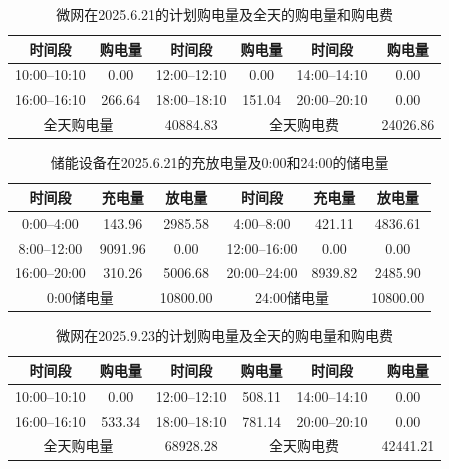 \documentclass[UTF8]{ctexart}
\begin{document}
    \begin{table}[htbp]
        \centering
        \caption{微网在2025.6.21的计划购电量及全天的购电量和购电费}
        \label{tab:q2_tenminute_0621}
        \begin{tabular}{cccccc}
            \toprule
            时间段 & 购电量 & 时间段 & 购电量 & 时间段 & 购电量 \\
            \midrule
            10:00--10:10 & 0.00 &
            12:00--12:10 & 0.00 &
            14:00--14:10 & 0.00 \\
            16:00--16:10 & 266.64 &
            18:00--18:10 & 151.04 &
            20:00--20:10 & 0.00 \\
            \midrule
            \multicolumn{2}{c}{全天购电量} &
            40884.83 &
            \multicolumn{2}{c}{全天购电费} &
            24026.86 \\
            \bottomrule
        \end{tabular}
    \end{table}
    
    \begin{table}[htbp]
        \centering
        \caption{储能设备在2025.6.21的充放电量及0:00和24:00的储电量}
        \label{tab:q2_battery_0621}
        \begin{tabular}{cccccc}
            \toprule
            时间段 & 充电量 & 放电量 & 时间段 & 充电量 & 放电量 \\
            \midrule
            0:00--4:00   & 143.96 & 2985.58 &
            4:00--8:00   & 421.11 & 4836.61 \\
            8:00--12:00  & 9091.96 & 0.00 &
            12:00--16:00 & 0.00 & 0.00 \\
            16:00--20:00 & 310.26 & 5006.68 &
            20:00--24:00 & 8939.82 & 2485.90 \\
            \midrule
            \multicolumn{2}{c}{0:00储电量} & 10800.00 &
            \multicolumn{2}{c}{24:00储电量} & 10800.00 \\
            \bottomrule
        \end{tabular}
    \end{table}
    
    \begin{table}[htbp]
        \centering
        \caption{微网在2025.9.23的计划购电量及全天的购电量和购电费}
        \label{tab:q2_tenminute_0923}
        \begin{tabular}{cccccc}
            \toprule
            时间段 & 购电量 & 时间段 & 购电量 & 时间段 & 购电量 \\
            \midrule
            10:00--10:10 & 0.00 &
            12:00--12:10 & 508.11 &
            14:00--14:10 & 0.00 \\
            16:00--16:10 & 533.34 &
            18:00--18:10 & 781.14 &
            20:00--20:10 & 0.00 \\
            \midrule
            \multicolumn{2}{c}{全天购电量} & 68928.28 &
            \multicolumn{2}{c}{全天购电费} & 42441.21 \\
            \bottomrule
        \end{tabular}
    \end{table}
    
\end{document}
